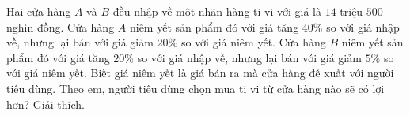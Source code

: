 \begin{bt}%
Hai cửa hàng $A$ và $B$ đều nhập về một nhãn hàng ti vi với giá là $14$ triệu $500$ nghìn đồng. Cửa hàng $A$ niêm yết sản phẩm đó với giá tăng $40\%$ so với giá nhập về, nhưng lại bán với giá giảm $20\%$ so với giá niêm yết. Cửa hàng $B$ niêm yết sản phẩm đó với giá tăng $20\%$ so với giá nhập về, nhưng lại bán với giá giảm $5\%$ so với giá niêm yết. Biết giá niêm yết là giá bán ra mà cửa hàng đề xuất với người tiêu dùng. Theo em, người tiêu dùng chọn mua ti vi từ cửa hàng nào sẽ có lợi hơn? Giải thích.
\end{bt}

